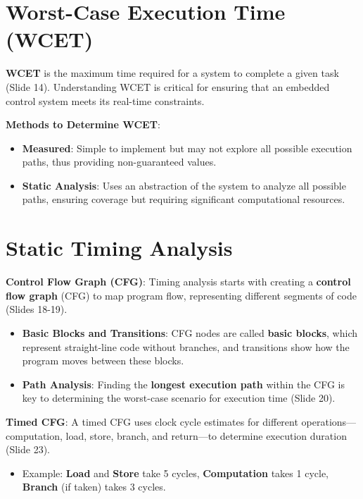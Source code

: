 \documentclass[
  14pt,
  a4paper,
  numbers=noendperiod,
  headinclude=true,
  footinclude=true,
  DIV=calc]{scrreprt}
\providecommand{\tightlist}{%
  \setlength{\itemsep}{0pt}\setlength{\parskip}{0pt}}\usepackage{longtable,booktabs,array}
\begin{document}
\section{Worst-Case Execution Time
(WCET)}\label{worst-case-execution-time-wcet}

\textbf{WCET} is the maximum time required for a system to complete a
given task (Slide 14). Understanding WCET is critical for ensuring that
an embedded control system meets its real-time constraints.

\textbf{Methods to Determine WCET}:

\begin{itemize}
\item
  \textbf{Measured}: Simple to implement but may not explore all
  possible execution paths, thus providing non-guaranteed values.
\item
  \textbf{Static Analysis}: Uses an abstraction of the system to analyze
  all possible paths, ensuring coverage but requiring significant
  computational resources.
\end{itemize}

\section{Static Timing Analysis}\label{static-timing-analysis}

\textbf{Control Flow Graph (CFG)}: Timing analysis starts with creating
a \textbf{control flow graph} (CFG) to map program flow, representing
different segments of code (Slides 18-19).

\begin{itemize}
\item
  \textbf{Basic Blocks and Transitions}: CFG nodes are called
  \textbf{basic blocks}, which represent straight-line code without
  branches, and transitions show how the program moves between these
  blocks.
\item
  \textbf{Path Analysis}: Finding the \textbf{longest execution path}
  within the CFG is key to determining the worst-case scenario for
  execution time (Slide 20).
\end{itemize}

\textbf{Timed CFG}: A timed CFG uses clock cycle estimates for different
operations---computation, load, store, branch, and return---to determine
execution duration (Slide 23).

\begin{itemize}
\tightlist
\item
  Example: \textbf{Load} and \textbf{Store} take 5 cycles,
  \textbf{Computation} takes 1 cycle, \textbf{Branch} (if taken) takes 3
  cycles.
\end{itemize}
\end{document}
